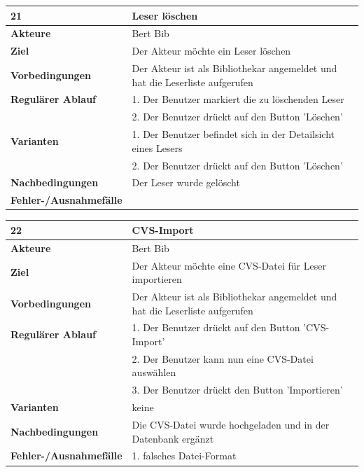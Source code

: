 \documentclass[fontsize=12pt,paper=a4,twoside]{scrartcl}
\begin{document}
\begin{table}[htbp]
\label{21}
\begin{tabular}{|l|p{10cm}|}
\hline 
\textbf{21} & \textbf{Leser löschen} \\ \hline
\textbf{Akteure} & Bert Bib\\ \hline
\textbf{Ziel} & Der Akteur möchte ein Leser löschen \\ \hline
\textbf{Vorbedingungen} & Der Akteur ist als Bibliothekar angemeldet und hat die Leserliste 
aufgerufen  \\ \hline
\textbf{Regulärer Ablauf} & 
1. Der Benutzer markiert die zu löschenden Leser\\
&2. Der Benutzer drückt auf den Button 'Löschen' \\
\hline
\textbf{Varianten} & 
1. Der Benutzer befindet sich in der Detailsicht eines Lesers\\
&2. Der Benutzer drückt auf den Button 'Löschen' \\ \hline
\textbf{Nachbedingungen} & Der Leser wurde gelöscht \\ \hline
\textbf{Fehler-/Ausnahmefälle} & \\
\hline
\end{tabular}
\end{table}

\begin{table}[htbp]
\label{22}
\begin{tabular}{|l|p{10cm}|}
\hline 
\textbf{22} & \textbf{CVS-Import} \\ \hline
\textbf{Akteure} & Bert Bib\\ \hline
\textbf{Ziel} & Der Akteur möchte eine CVS-Datei für Leser importieren \\ \hline
\textbf{Vorbedingungen} & Der Akteur ist als Bibliothekar angemeldet und hat die Leserliste aufgerufen\\
\hline
\textbf{Regulärer Ablauf} & 
1. Der Benutzer drückt auf den Button 'CVS-Import' \\
&2. Der Benutzer kann nun eine CVS-Datei auswählen\\
&3. Der Benutzer drückt den Button 'Importieren'\\
\hline
\textbf{Varianten} & 
keine \\ \hline
\textbf{Nachbedingungen} & Die CVS-Datei wurde hochgeladen und in der Datenbank ergänzt\\ \hline
\textbf{Fehler-/Ausnahmefälle} & 1. falsches Datei-Format\\
\hline
\end{tabular}
\end{table}
\end{document}
